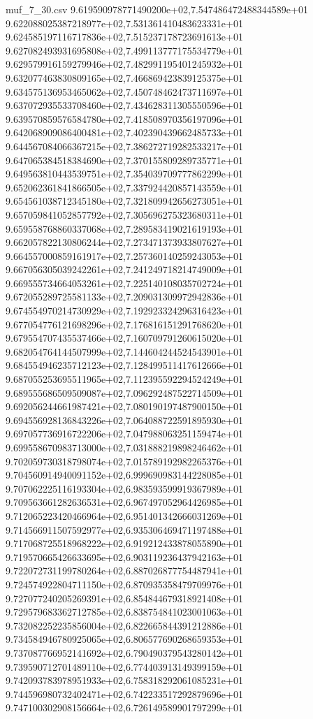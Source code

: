 \begin{filecontents*}{muf_7_30.csv}
9.619590978771490200e+02,7.547486472488344589e+01
9.622088025387218977e+02,7.531361410483623331e+01
9.624585197116717836e+02,7.515237178723691613e+01
9.627082493931695808e+02,7.499113777175534779e+01
9.629579916159279946e+02,7.482991195401245932e+01
9.632077463830809165e+02,7.466869423839125375e+01
9.634575136953465062e+02,7.450748462473711697e+01
9.637072935533708460e+02,7.434628311305550596e+01
9.639570859576584780e+02,7.418508970356197096e+01
9.642068909086400481e+02,7.402390439662485733e+01
9.644567084066367215e+02,7.386272719282533217e+01
9.647065384518384690e+02,7.370155809289735771e+01
9.649563810443539751e+02,7.354039709777862299e+01
9.652062361841866505e+02,7.337924420857143559e+01
9.654561038712345180e+02,7.321809942656273051e+01
9.657059841052857792e+02,7.305696275323680311e+01
9.659558768860337068e+02,7.289583419021619193e+01
9.662057822130806244e+02,7.273471373933807627e+01
9.664557000859161917e+02,7.257360140259243053e+01
9.667056305039242261e+02,7.241249718214749009e+01
9.669555734664053261e+02,7.225140108035702724e+01
9.672055289725581133e+02,7.209031309972942836e+01
9.674554970214730929e+02,7.192923324296316423e+01
9.677054776121698296e+02,7.176816151291768620e+01
9.679554707435537466e+02,7.160709791260615020e+01
9.682054764144507999e+02,7.144604244524543901e+01
9.684554946235712123e+02,7.128499511417612666e+01
9.687055253695511965e+02,7.112395592294524249e+01
9.689555686509509087e+02,7.096292487522714509e+01
9.692056244661987421e+02,7.080190197487900150e+01
9.694556928136843226e+02,7.064088722591895930e+01
9.697057736916722206e+02,7.047988063251159474e+01
9.699558670983713000e+02,7.031888219898246462e+01
9.702059730318798074e+02,7.015789192982265376e+01
9.704560914940091152e+02,6.999690983144228085e+01
9.707062225116193304e+02,6.983593599919367989e+01
9.709563661282636531e+02,6.967497052964426985e+01
9.712065223420466964e+02,6.951401342666031269e+01
9.714566911507592977e+02,6.935306469471197488e+01
9.717068725518968222e+02,6.919212433878055890e+01
9.719570665426633695e+02,6.903119236437942163e+01
9.722072731199780264e+02,6.887026877754487941e+01
9.724574922804711150e+02,6.870935358479709976e+01
9.727077240205269391e+02,6.854844679318921408e+01
9.729579683362712785e+02,6.838754841023001063e+01
9.732082252235856004e+02,6.822665844391212886e+01
9.734584946780925065e+02,6.806577690268659353e+01
9.737087766952141692e+02,6.790490379543280142e+01
9.739590712701489110e+02,6.774403913149399159e+01
9.742093783978951933e+02,6.758318292061085231e+01
9.744596980732402471e+02,6.742233517292879696e+01
9.747100302908156664e+02,6.726149589901797299e+01

\end{filecontents*}
